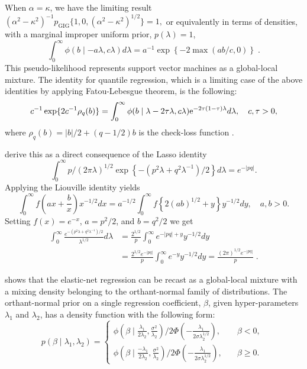 \documentclass[ECP]{ejpecp} %
\begin{document}
\begin{remark}
When $\alpha = \kappa$, we have the limiting result $(\alpha^2-\kappa^2)^{-1} p_{\mathrm{GIG}}\{1,0, (\alpha^2-\kappa^2)^{1/2} \} = 1,$
or equivalently in terms of densities, with a marginal improper uniform prior, $p(\lambda) = 1$,
\begin{equation}
  \int_{0}^{\infty} \phi(b \mid -a\lambda, c\lambda) d\lambda = a^{-1} \exp\left\{-2 \max(ab/c,0)\right\}
  \;. 
  \label{eq:svm}
\end{equation}
This pseudo-likelihood represents support vector machines as a global-local mixture. The identity for quantile regression, which is a limiting case of the above identities by applying Fatou-Lebesgue theorem, is the following: 
\[
c^{-1}\exp\{ 2c^{-1} \rho_q(b) \}= \int_{0}^{\infty} \phi( b \mid \lambda - 2\tau \lambda, c \lambda){\rm e}^{-2\tau(1-\tau)\lambda} d\lambda, \quad c, \tau > 0,
\]
where $\rho_q(b) = \rvert b \lvert / 2 + (q-1/2) b$ is the check-loss function \cite{polson_data_2013}.
\end{remark}

\cite{polson_data_2011} derive this as a direct consequence of the Lasso identity 
\[
\int_0^{\infty} p/(2 \pi \lambda)^{1/2} \exp\left\{-\left(p^2 \lambda+q^2 \lambda^{-1}\right)/2\right\} d\lambda = e^{-\lvert pq \rvert}.
\]
Applying the Liouville identity yields
\[
\int_{0}^{\infty} f\left(ax + \frac{b}{x} \right) x^{-1/2} dx = a^{-1/2} \int_{0}^{\infty} f\left\{ 2 (ab)^{1/2} + y \right\} y^{-1/2} dy, \quad a, b > 0.
\]
Setting $f(x) = e^{-x}$, $a = p^2/2$, and $b = q^2/2$ we get
\begin{align*}
  \int_0^{\infty} \frac{e^{-(p^2 \lambda + q^2 \lambda^{-1})/2}}{\lambda^{1/2}} d\lambda
  & = \frac{2^{1/2}}{p} \int_0^{\infty} e^{-|pq| + y} y^{-1/2} d y \\
  & = \frac{2^{1/2} e^{-|pq|}}{p} \int_0^{\infty} e^{-y} y^{-1/2} d y 
  = \frac{(2\pi)^{1/2} e^{-|pq|}}{p}
  \;.
\end{align*}

\cite{hans2011comment} shows that the elastic-net regression can be recast as a
global-local mixture with a mixing density belonging to the orthant-normal
family of distributions.  The orthant-normal prior on a single regression
coefficient, $\beta$, given hyper-parameters $\lambda_1$ and $\lambda_2$, 
has a density function with the following form:
\begin{equation}
  p(\beta \mid \lambda_1, \lambda_2)  = 
  \begin{cases} 
   \phi(\beta \mid \frac{\lambda_1}{2\lambda_2}, \frac{\sigma^2}{\lambda_2}) 
   / 2\Phi\left(-\frac{\lambda_1}{2\sigma \lambda_2^{1/2} }\right), & \quad \beta < 0, 
   \\
   \phi(\beta \mid \frac{-\lambda_1}{2\lambda_2}, \frac{\sigma^2}{\lambda_2}) / 
   2\Phi\left(-\frac{\lambda_1}{2\sigma \lambda_2^{1/2} }\right), & \quad \beta \geq 0.
  \end{cases} 
  \;
  \label{eq:hans}
\end{equation}
\end{document}
